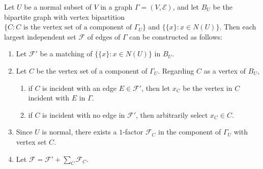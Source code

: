 Let $U$ be a normal subset of $V$ in a graph $\Gamma = (V, \mathcal{E})$, and let $B_U$ be the bipartite graph with vertex bipartition $\{C: C \text{ is the vertex set of a component of } \Gamma_U\}$ and $\{\{x\}: x \in N(U)\}$. Then each largest independent set $\mathcal{F}$ of edges of $\Gamma$ can be constructed as follows:

\begin{enumerate}
\item[(a)] Let $\mathcal{F}'$ be a matching of $\{\{x\}: x \in N(U)\}$ in $B_U$.
\item[(b)] Let $C$ be the vertex set of a component of $\Gamma_U$. Regarding $C$ as a vertex of $B_U$,
\begin{enumerate}
\item[(i)] if $C$ is incident with an edge $E \in \mathcal{F}'$, then let $x_C$ be the vertex in $C$ incident with $E$ in $\Gamma$.
\item[(ii)] if $C$ is incident with no edge in $\mathcal{F}'$, then arbitrarily select $x_C \in C$.
\end{enumerate}
\item[(c)] Since $U$ is normal, there exists a $1$-factor $\mathcal{F}_C$ in the component of $\Gamma_U$ with vertex set $C$.
\item[(d)] Let $\mathcal{F} = \mathcal{F}' + \sum_C \mathcal{F}_C$.
\end{enumerate}
